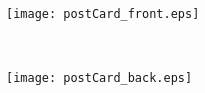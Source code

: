 \documentclass[12pt]{article}
\begin{document}
\begin{center}

~\vfill

\texttt{[image: postCard\_front.eps]}

\vfill

\end{center}

\newpage

\begin{center}

~\vfill

\texttt{[image: postCard\_back.eps]}

\vfill

\end{center}
\end{document}
